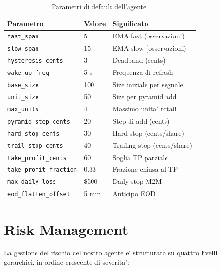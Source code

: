 \documentclass[11pt,a4paper]{article}
\begin{document}
\begin{table}[h]
\centering
\caption{Parametri di default dell'agente.}
\label{tab:params}
\begin{tabular}{lll}
\toprule
\textbf{Parametro} & \textbf{Valore} & \textbf{Significato} \\
\midrule
\texttt{fast\_span}            & 5         & EMA fast (osservazioni) \\
\texttt{slow\_span}            & 15        & EMA slow (osservazioni) \\
\texttt{hysteresis\_cents}     & 3         & Deadband (cents) \\
\texttt{wake\_up\_freq}        & 5 s       & Frequenza di refresh \\
\texttt{base\_size}            & 100       & Size iniziale per segnale \\
\texttt{unit\_size}            & 50        & Size per pyramid add \\
\texttt{max\_units}            & 4         & Massimo unita' totali \\
\texttt{pyramid\_step\_cents}  & 20        & Step di add (cents) \\
\texttt{hard\_stop\_cents}     & 30        & Hard stop (cents/share) \\
\texttt{trail\_stop\_cents}    & 40        & Trailing stop (cents/share) \\
\texttt{take\_profit\_cents}   & 60        & Soglia TP parziale \\
\texttt{take\_profit\_fraction}& 0.33      & Frazione chiusa al TP \\
\texttt{max\_daily\_loss}      & \$500     & Daily stop M2M \\
\texttt{eod\_flatten\_offset}  & 5 min     & Anticipo EOD \\
\bottomrule
\end{tabular}
\end{table}

\section{Risk Management}
\label{sec:risk}

La gestione del rischio del nostro agente e' strutturata su quattro
livelli gerarchici, in ordine crescente di severita':
\end{document}
